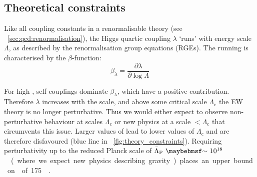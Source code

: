 


\subsection{Theoretical constraints}
\label{sec:prior_constraints:theory}

Like all coupling constants in a renormalisable theory (see 
\Section~\ref{sec:qcd:renormalisation}), the Higgs quartic coupling $\lambda$ `runs' with 
energy scale $\Lambda$, as described by the renormalisation group equations (RGEs). The 
running is characterised by the $\beta$-function:
\begin{equation*}
	\beta_{\lambda} = \frac{\partial \lambda}{\partial \log\Lambda}
\end{equation*}

For high \mH, self-couplings dominate $\beta_{\lambda}$, which have a
positive contribution. Therefore $\lambda$ increases with the scale, and above some 
critical scale $\Lambda_{\text{c}}$ the EW theory is no longer perturbative. Thus we 
would either expect to observe non-perturbative behaviour at scales 
\about$\Lambda_{\text{c}}$ or new physics at a scale $<\Lambda_{\text{c}}$ that 
circumvents this issue. Larger values of \mH lead to lower values of $\Lambda_{\text{c}}$ 
and are therefore disfavoured (blue line in \Figure~\ref{fig:theory_constraints}). 
Requiring perturbativity up to the reduced Planck scale of 
\unit{$\bar{\Lambda}_{\text{P}}~\about~10^{18}$}{\GeV} (where we expect new physics 
describing gravity) places an upper bound on \mH of \unit{175}{\GeV} \cite{Ellis:2009}.


